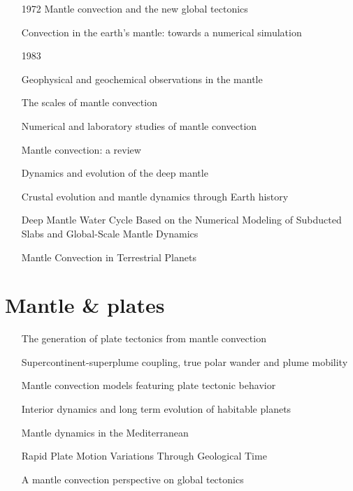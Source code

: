    \begin{itemize}
   \item [1972] Mantle convection and the new global tectonics \cite{tuox72}
   \item [\nineteenseventyfour] Convection in the earth’s mantle: towards a numerical simulation \cite{mcrw74}
   \item [1983] 
   \item [\nineteenninetytwo] Geophysical and geochemical observations in the mantle \cite{dari92}
   \item [\nineteenninetyeight] The scales of mantle convection \cite{ande98}
   \item [\twothousandfive] Numerical and laboratory studies of mantle convection \cite{taxn05}
   \item [\twothousandeight] Mantle convection: a review \cite{ogaw08}
   \item [\twothousandtwelve] Dynamics and evolution of the deep mantle  \cite{tack12}
   \item [\twothousandeighteen] Crustal evolution and mantle dynamics through Earth history \cite{kore18}
   \item [\twothousandnineteen] Deep Mantle Water Cycle Based on the Numerical Modeling of Subducted Slabs and Global-Scale Mantle Dynamics \cite{nana19}
   \item [\twothousandtwenty] Mantle Convection in Terrestrial Planets \cite{mube20}
   \end{itemize}

\section{Mantle \& plates}

   \begin{itemize}
   \item [\twothousandthree] The generation of plate tectonics from mantle convection \cite{berc03}
   \item [\twothousandnine] Supercontinent-superplume coupling, true polar wander and plume mobility \cite{lizh09}
   \item [\twothousandeleven] Mantle convection models featuring plate tectonic behavior \cite{lowm11}
   \item [\twothousandtwelve] Interior dynamics and long term evolution of habitable planets \cite{taab12}
   \item [\twothousandfourteen] Mantle dynamics in the Mediterranean \cite{faba14}
   \item [\twothousandfifteen] Rapid Plate Motion Variations Through Geological Time \cite{iabu15}
   \item [\twothousandseventeen] A mantle convection perspective on global tectonics \cite{cogu17}
   \end{itemize}

